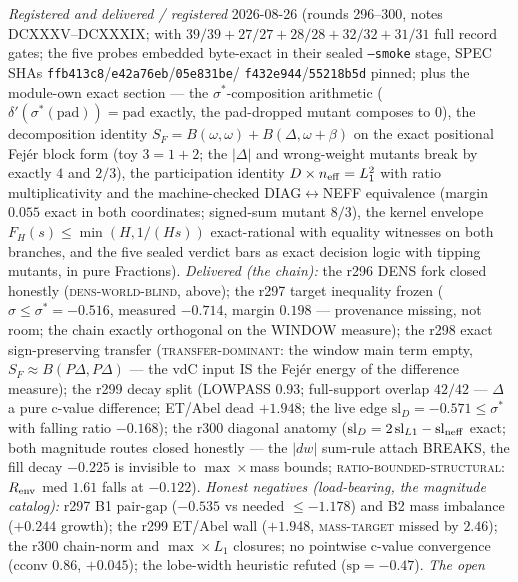 {\sloppy
\emph{Registered and delivered / registered} 2026-08-26 (rounds
296--300, notes DCXXXV--DCXXXIX;
 with $39/39 + 27/27 + 28/28 +
32/32 + 31/31$ full record gates; the five probes embedded
byte-exact in their sealed \texttt{--smoke} stage, SPEC SHAs
\texttt{ffb413c8}/\texttt{e42a76eb}/\texttt{05e831be}/%
\texttt{f432e944}/\texttt{55218b5d} pinned; plus the module-own
exact section --- the $\sigma^*$-composition arithmetic
($\delta'(\sigma^*(\mathrm{pad})) = \mathrm{pad}$ exactly, the
pad-dropped mutant composes to $0$), the decomposition identity
$S_F = B(\omega,\omega) + B(\Delta,\omega+\beta)$ on the exact
positional Fej\'er block form (toy $3 = 1 + 2$; the $|\Delta|$ and
wrong-weight mutants break by exactly $4$ and $2/3$), the
participation identity $D \times n_{\rm eff} = L_1^2$ with ratio
multiplicativity and the machine-checked DIAG$\leftrightarrow$NEFF
equivalence (margin $0.055$ exact in both coordinates; signed-sum
mutant $8/3$), the kernel envelope $F_H(s) \le \min(H, 1/(Hs))$
exact-rational with equality witnesses on both branches, and the
five sealed verdict bars as exact decision logic with tipping
mutants, in pure Fractions).  \emph{Delivered (the chain):} the
r296 DENS fork closed honestly (\textsc{dens-world-blind}, above);
the r297 target inequality frozen ($\sigma \le \sigma^* = -0.516$,
measured $-0.714$, margin $0.198$ --- provenance missing, not
room; the chain exactly orthogonal on the WINDOW measure); the
r298 exact sign-preserving transfer (\textsc{transfer-dominant}:
the window main term empty, $S_F \approx B(P\Delta,P\Delta)$ ---
the vdC input IS the Fej\'er energy of the difference measure);
the r299 decay split (LOWPASS $0.93$; full-support overlap $42/42$
--- $\Delta$ a pure c-value difference; ET/Abel dead $+1.948$; the
live edge $\mathrm{sl}_D = -0.571 \le \sigma^*$ with falling ratio
$-0.168$); the r300 diagonal anatomy ($\mathrm{sl}_D =
2\,\mathrm{sl}_{L1} - \mathrm{sl}_{\rm neff}$ exact; both
magnitude routes closed honestly --- the $|dw|$ sum-rule attach
BREAKS, the fill decay $-0.225$ is invisible to $\max\times$mass
bounds; \textsc{ratio-bounded-structural}: $R_{\rm env}$ med
$1.61$ falls at $-0.122$).  \emph{Honest negatives (load-bearing,
the magnitude catalog):} r297 B1 pair-gap ($-0.535$ vs needed
$\le -1.178$) and B2 mass imbalance ($+0.244$ growth); the r299
ET/Abel wall ($+1.948$, \textsc{mass-target} missed by $2.46$);
the r300 chain-norm and $\max\times L_1$ closures; no pointwise
c-value convergence (cconv $0.86$, $+0.045$); the lobe-width
heuristic refuted ($\mathrm{sp} = -0.47$).  \emph{The open
}}
